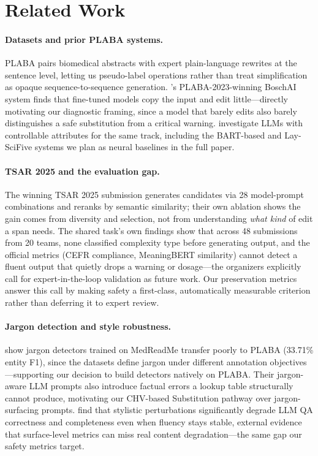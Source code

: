 \documentclass[11pt]{article}
\begin{document}
\section{Related Work}

\paragraph{Datasets and prior PLABA systems.}
PLABA \citep{attal2023plaba} pairs biomedical abstracts with expert
plain-language rewrites at the sentence level, letting us pseudo-label
operations rather than treat simplification as opaque sequence-to-sequence
generation. \citet{knappich2023boschai}'s PLABA-2023-winning BoschAI
system finds that fine-tuned models copy the input and edit
little---directly motivating our diagnostic framing, since a model that
barely edits also barely distinguishes a safe substitution from a
critical warning. \citet{li2024beemanc} investigate LLMs with
controllable attributes for the same track, including the BART-based and
Lay-SciFive systems we plan as neural baselines in the full paper.

\paragraph{TSAR 2025 and the evaluation gap.}
The winning TSAR 2025 submission \citep{miyata2025ehimenlp} generates
candidates via 28 model-prompt combinations and reranks by semantic
similarity; their own ablation shows the gain comes from diversity and
selection, not from understanding \emph{what kind} of edit a span needs.
The shared task's own findings \citep{alvamanchego2025tsarfindings} show
that across 48 submissions from 20 teams, none classified complexity
type before generating output, and the official metrics (CEFR compliance,
MeaningBERT similarity) cannot detect a fluent output that quietly drops
a warning or dosage---the organizers explicitly call for
expert-in-the-loop validation as future work. Our preservation metrics
answer this call by making safety a first-class, automatically measurable
criterion rather than deferring it to expert review.

\paragraph{Jargon detection and style robustness.}
\citet{papandreou2025jargon} show jargon detectors trained on MedReadMe
transfer poorly to PLABA (33.71\% entity F1), since the datasets define
jargon under different annotation objectives---supporting our decision to
build detectors natively on PLABA. Their jargon-aware LLM prompts also
introduce factual errors a lookup table structurally cannot produce,
motivating our CHV-based Substitution pathway over jargon-surfacing
prompts. \citet{rahman2025spqa} find that stylistic perturbations
significantly degrade LLM QA correctness and completeness even when
fluency stays stable, external evidence that surface-level metrics can
miss real content degradation---the same gap our safety metrics target.
\end{document}
